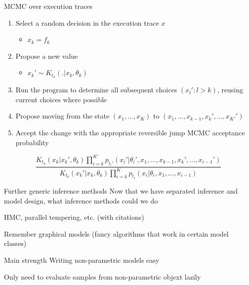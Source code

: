 \begin{frame}{MCMC over execution traces}
  \begin{enumerate}
    \item Select a random decision in the execution trace $x$
    \begin{itemize}
      \item{\eg $x_k = f_k$}
    \end{itemize}
    \item Propose a new value
    \begin{itemize}
      \item{\eg $x_k' \sim K_{t_k}(.|x_k,\theta_k)$}
    \end{itemize}
    \item Run the program to determine all subsequent choices $(x_l' : l > k)$, reusing current choices where possible
    \item Propose moving from the state $(x_1,\ldots,x_K)$ to $(x_1,\ldots,x_{k-1},x_k',\ldots,x_{K'}')$
    \item Accept the change with the appropriate reversible jump MCMC acceptance probability
  \end{enumerate}
  \begin{equation*}
    \frac{K_{t_k}(x_k|x_k',\theta_k)\prod_{i=k}^{K'} p_{t_i'}(x_i'|\theta_{i}',x_1,\ldots,x_{k-1},x_k',\ldots,x_{i-1}')}{K_{t_k}(x_k'|x_k,\theta_k)\prod_{i=k}^K p_{t_i}(x_i|\theta_{i},x_1,\ldots,x_{i-1})}
  \end{equation*}
\end{frame}


\begin{frame}{Further generic inference methods}
Now that we have separated inference and model design, what inference methods could we do

\eg HMC, parallel tempering, etc. (with citations)

Remember graphical models (fancy algorithms that work in certain model classes)
\end{frame}

\begin{frame}{Main strength}
Writing non-parametric models easy

Only need to evaluate samples from non-parametric objext lazily
\end{frame}


